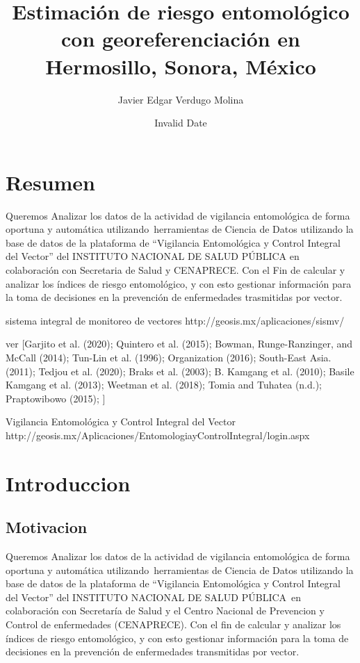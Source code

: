 \documentclass[
  letterpaper,
  twocolumn,
  landscape]{report}
\title{Estimación de riesgo entomológico con georeferenciación en
Hermosillo, Sonora, México}
\author{Javier Edgar Verdugo Molina}
\date{Invalid Date}
\renewcommand*\contentsname{Table of contents}
\newcommand\contentsname{Table of contents}
\begin{document}
\maketitle

\renewcommand*\contentsname{Table of contents}
{
\hypersetup{linkcolor=}
\setcounter{tocdepth}{2}
\tableofcontents
}
\listoffigures
\listoftables
{}

\chapter*{Resumen}\label{resumen}


Queremos Analizar los datos de la actividad de vigilancia entomológica
de forma oportuna y automática utilizando~herramientas de Ciencia de
Datos utilizando la base de datos de la plataforma de ``Vigilancia
Entomológica y Control Integral del Vector'' del INSTITUTO NACIONAL DE
SALUD PÚBLICA en colaboración con Secretaria de Salud y CENAPRECE. Con
el Fin de calcular y analizar los índices de riesgo entomológico, y con
esto gestionar información para la toma de decisiones en la prevención
de enfermedades trasmitidas por vector.

sistema integral de monitoreo de vectores
http://geosis.mx/aplicaciones/sismv/

ver {[}Garjito et al. (2020); Quintero et al. (2015); Bowman,
Runge-Ranzinger, and McCall (2014); Tun-Lin et al. (1996); Organization
(2016); South-East Asia. (2011); Tedjou et al. (2020); Braks et al.
(2003); B. Kamgang et al. (2010); Basile Kamgang et al. (2013); Weetman
et al. (2018); Tomia and Tuhatea (n.d.); Praptowibowo (2015); {]}

Vigilancia Entomológica y Control Integral del Vector
http://geosis.mx/Aplicaciones/EntomologiayControlIntegral/login.aspx


\chapter{Introduccion}\label{introduccion}

\section{Motivacion}\label{motivacion}

Queremos Analizar los datos de la actividad de vigilancia entomológica
de forma oportuna y automática utilizando~herramientas de Ciencia de
Datos utilizando la base de datos de la plataforma de ``Vigilancia
Entomológica y Control Integral del Vector'' del INSTITUTO NACIONAL DE
SALUD PÚBLICA~en colaboración con Secretaría de Salud y el Centro
Nacional de Prevencion y Control de enfermedades (CENAPRECE). Con el fin
de calcular y analizar los índices de riesgo entomológico, y con esto
gestionar información para la toma de decisiones en la prevención de
enfermedades transmitidas por vector.
\end{document}
